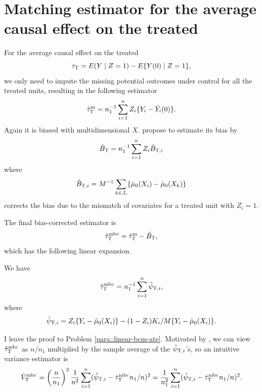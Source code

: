  
 
 \section{Matching estimator for the average causal effect on the treated}

 
For the average causal effect on the treated 
$$
\tau_\textsc{T} = E(Y\mid Z=1) - E\{  Y(0)  \mid Z=1\},
$$ 
we only need to impute the missing potential outcomes under control for all the treated units, resulting in the following estimator
$$
\hat{\tau}_\textsc{T}^\textup{m} = n_1^{-1} \sum_{i=1}^n Z_i \{  Y_i - \hat{Y}_i(0) \}.
$$
Again it is biased with multidimensional $X$.
\citet{otsu2017bootstrap} propose to estimate its bias by 
$$  
\hat{B}_\textsc{T} = n_1^{-1} \sum_{i=1}^n Z_i  \hat{B}_{\textsc{T},i} 
$$
where
$$
\hat{B}_{\textsc{T},i} = M^{-1} \sum_{k \in J_i} \{  \hat{\mu}_0(X_i) -  \hat{\mu}_0(X_k)     \}
$$
corrects the bias due to the mismatch of covariates for a treated unit with $Z_i = 1.$


The final bias-corrected estimator is
$$
\hat{\tau}_\textsc{T}^\textup{mbc} = \hat{\tau}_\textsc{T}^\textup{m} - \hat{B}_\textsc{T},
$$ 
which has the following linear expansion.

\begin{proposition}\label{prop::linear-expansion-att}
We have 
\begin{eqnarray}\label{eq::linearATT}
\hat{\tau}_\textsc{T}^\textup{mbc}  =   n_1^{-1} \sumn \hat{\psi}_{\textsc{T}, i},
\end{eqnarray}
where 
$$
\hat{\psi}_{\textsc{T}, i} =   Z_i \{ Y_i - \hat{\mu}_0(X_i) \}
- (1-Z_i) K_i/M \{ Y_i - \hat{\mu}_0(X_i) \} . 
$$
\end{proposition}

I leave the proof to Problem \ref{para::linear-bcm-ate}. 
Motivated by \citet{otsu2017bootstrap}, we can view $\hat{\tau}_\textsc{T}^\textup{mbc}  $ as $n/n_1$ multiplied by the sample average of the $\hat{\psi}_{\textsc{T}, i}$'s, so an intuitive variance estimator is
$$
\hat{V}_\textsc{T}^\textup{mbc} =  \left( \frac{n}{n_1} \right)^2 \frac{1}{n^2} \sum_{i=1}^n (\hat{\psi}_{\textsc{T}, i} - \hat{\tau}_\textsc{T}^\textup{mbc} n_1/n)^2 = \frac{1}{n_1^2} \sum_{i=1}^n (\hat{\psi}_{\textsc{T}, i} - \hat{\tau}_\textsc{T}^\textup{mbc} n_1/n )^2.
$$

